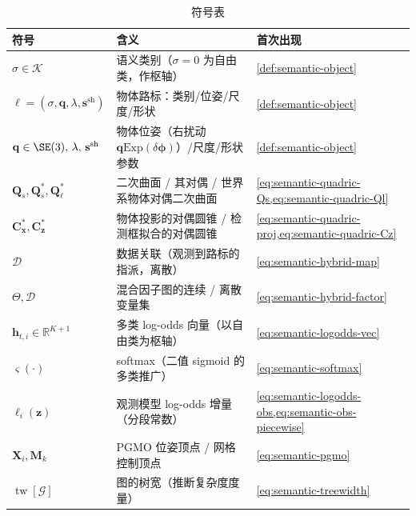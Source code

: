 \begin{table}[H]\centering\small
\caption{符号表}
\begin{tabular}{lll}
\toprule
符号 & 含义 & 首次出现 \\
\midrule
$\sigma\in\mathcal{K}$ & 语义类别（$\sigma{=}0$ 为自由类，作枢轴） & \cref{def:semantic-object} \\
$\boldsymbol\ell=(\sigma,\mathbf{q},\lambda,\mathbf{s}^{\mathrm{sh}})$ & 物体路标：类别/位姿/尺度/形状 & \cref{def:semantic-object} \\
$\mathbf{q}\in\SE(3),\,\lambda,\,\mathbf{s}^{\mathrm{sh}}$ & 物体位姿（右扰动 $\mathbf{q}\mathrm{Exp}(\delta\boldsymbol\phi)$）/尺度/形状参数 & \cref{def:semantic-object} \\
$\mathbf{Q}_s,\mathbf{Q}_s^{*},\mathbf{Q}_\ell^{*}$ & 二次曲面 / 其对偶 / 世界系物体对偶二次曲面 & \cref{eq:semantic-quadric-Qs,eq:semantic-quadric-Ql} \\
$\mathbf{C}^{*}_{\mathbf{x}},\mathbf{C}^{*}_{\mathbf{z}}$ & 物体投影的对偶圆锥 / 检测框拟合的对偶圆锥 & \cref{eq:semantic-quadric-proj,eq:semantic-quadric-Cz} \\
$\mathcal{D}$ & 数据关联（观测到路标的指派，离散） & \cref{eq:semantic-hybrid-map} \\
$\Theta,\mathcal{D}$ & 混合因子图的连续 / 离散变量集 & \cref{eq:semantic-hybrid-factor} \\
$\mathbf{h}_{t,i}\in\mathbb{R}^{K+1}$ & 多类 log-odds 向量（以自由类为枢轴） & \cref{eq:semantic-logodds-vec} \\
$\boldsymbol\varsigma(\cdot)$ & softmax（二值 sigmoid 的多类推广） & \cref{eq:semantic-softmax} \\
$\boldsymbol\ell_i(\mathbf{z})$ & 观测模型 log-odds 增量（分段常数） & \cref{eq:semantic-logodds-obs,eq:semantic-obs-piecewise} \\
$\mathbf{X}_i,\mathbf{M}_k$ & PGMO 位姿顶点 / 网格控制顶点 & \cref{eq:semantic-pgmo} \\
$\operatorname{tw}[\mathcal{G}]$ & 图的树宽（推断复杂度度量） & \cref{eq:semantic-treewidth} \\
\bottomrule
\end{tabular}
\end{table}

